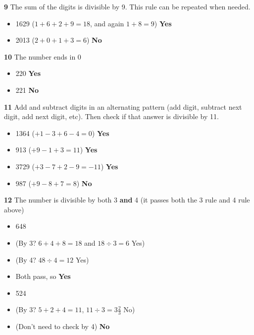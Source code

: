\vspace{7 mm}

\textbf{9} The sum of the digits is divisible by 9. This rule can be repeated when needed.

\begin{itemize}
  \item 1629 ($1+6+2+9=18$, and again $1+8=9$) \textbf{Yes}
  \item 2013 ($2+0+1+3=6$) \textbf{No}
\end{itemize}

\textbf{10} The number ends in 0

\begin{itemize}
  \item 220 \textbf{Yes}
  \item 221 \textbf{No}
\end{itemize}

\textbf{11} Add and subtract digits in an alternating pattern (add digit, subtract next digit, add next digit, etc). Then check if that answer is divisible by 11.

\begin{itemize}
  \item 1364 ($+1-3+6-4=0$) \textbf{Yes}
  \item 913 ($+9-1+3=11$) \textbf{Yes}
  \item 3729 ($+3-7+2-9=-11$) \textbf{Yes}
  \item 987 ($+9-8+7=8$) \textbf{No}
\end{itemize}

\vspace{7 mm}

\textbf{12} The number is divisible by both 3 \textbf{and} 4 (it passes both the 3 rule and 4 rule above)

\begin{itemize}
  \item 648
  \item (By 3? $6+4+8=18$ and $18\div 3=6$ Yes)
  \item (By 4? $48\div 4=12$ Yes)
  \item Both pass, so \textbf{Yes}
\end{itemize}

\begin{itemize}
  \item 524
  \item (By 3? $5+2+4=11$, $11\div 3=3\frac{2}{3}$ No)
  \item (Don't need to check by 4) \textbf{No}
\end{itemize}

